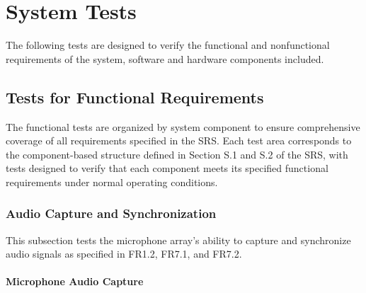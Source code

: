\documentclass[12pt, titlepage]{article}
\begin{document}


\section{System Tests}

The following tests are designed to verify the functional and nonfunctional
requirements of the system, software and hardware components included.

\subsection{Tests for Functional Requirements}

The functional tests are organized by system component to ensure comprehensive
coverage of all requirements specified in the SRS. Each test area
corresponds to the component-based structure defined in Section S.1 and S.2 of
the SRS, with tests designed to verify that each component meets its specified
functional requirements under normal operating conditions.

\subsubsection{Audio Capture and Synchronization}

This subsection tests the microphone array's ability to capture and synchronize
audio signals as specified in FR1.2, FR7.1, and FR7.2.
		
\paragraph{Microphone Audio Capture}
\end{document}
